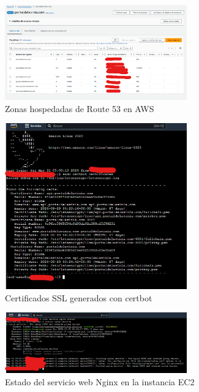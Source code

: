\begin{figure}[H]
    \centering
    \includegraphics[width=0.7\textwidth]{resources/images/aws-route53}
    \caption{Zonas hospedadas de Route 53 en AWS}
    \label{fig:route53}
\end{figure}

\begin{figure}[H]
    \centering
    \includegraphics[width=0.7\textwidth]{resources/images/aws-certificates}
    \caption{Certificados SSL generados con certbot}
    \label{fig:certbot}
\end{figure}

\begin{figure}[H]
    \centering
    \includegraphics[width=0.7\textwidth]{resources/images/aws-nginx}
    \caption{Estado del servicio web Nginx en la instancia EC2}
    \label{fig:nginx}
\end{figure}

